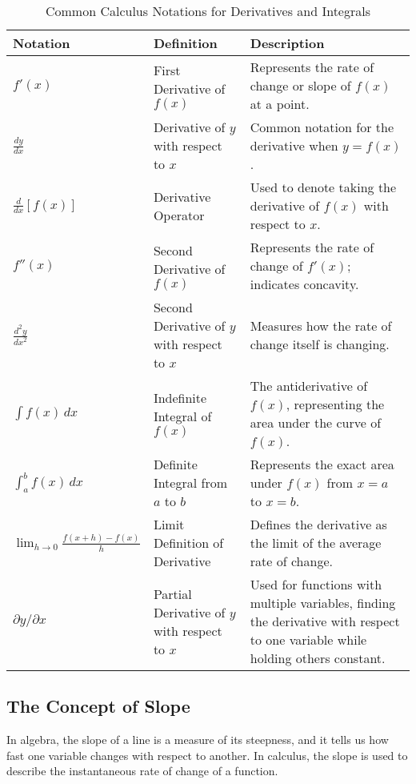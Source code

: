 \begin{table}[h!]
    \centering
    \begin{tabular}{|l|p{3cm}|p{5cm}|}
        \hline
        \textbf{Notation} & \textbf{Definition} & \textbf{Description} \\
        \hline
        $f'(x)$ & First Derivative of $f(x)$ & Represents the rate of change or slope of $f(x)$ at a point. \\
        \hline
        $\frac{dy}{dx}$ & Derivative of $y$ with respect to $x$ & Common notation for the derivative when $y = f(x)$. \\
        \hline
        $\frac{d}{dx}\left[ f(x) \right]$ & Derivative Operator & Used to denote taking the derivative of $f(x)$ with respect to $x$. \\
        \hline
        $f''(x)$ & Second Derivative of $f(x)$ & Represents the rate of change of $f'(x)$; indicates concavity. \\
        \hline
        $\frac{d^2y}{dx^2}$ & Second Derivative of $y$ with respect to $x$ & Measures how the rate of change itself is changing. \\
        \hline
        $\int f(x) \, dx$ & Indefinite Integral of $f(x)$ & The antiderivative of $f(x)$, representing the area under the curve of $f(x)$. \\
        \hline
        $\int_a^b f(x) \, dx$ & Definite Integral from $a$ to $b$ & Represents the exact area under $f(x)$ from $x = a$ to $x = b$. \\
        \hline
        $\lim_{h \to 0} \frac{f(x+h) - f(x)}{h}$ & Limit Definition of Derivative & Defines the derivative as the limit of the average rate of change. \\
        \hline
        $\partial y / \partial x$ & Partial Derivative of $y$ with respect to $x$ & Used for functions with multiple variables, finding the derivative with respect to one variable while holding others constant. \\
        \hline
    \end{tabular}
    \caption{Common Calculus Notations for Derivatives and Integrals}
\end{table}

\subsection{The Concept of Slope}
In algebra, the slope of a line is a measure of its steepness, and it tells us how fast one variable changes with respect to another. In calculus, the slope is used to describe the instantaneous rate of change of a function.

